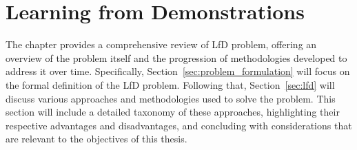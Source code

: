 \section{Learning from Demonstrations}
\label{sec:sota}
The chapter provides a comprehensive review of LfD problem, offering an overview of the problem itself and the progression of methodologies developed to address it over time. Specifically, Section~\ref{sec:problem_formulation} will focus on the formal definition of the LfD problem. Following that, Section~\ref{sec:lfd} will discuss various approaches and methodologies used to solve the problem. This section will include a detailed taxonomy of these approaches, highlighting their respective advantages and disadvantages, and concluding with considerations that are relevant to the objectives of this thesis.



% 